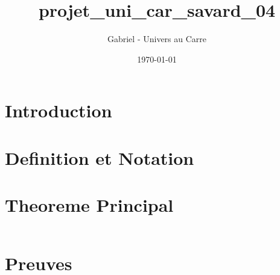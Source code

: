 \documentclass[12pt]{article}
\title{projet_uni_car_savard_04}
\author{Gabriel - Univers au Carre}
\date{\today}
\begin{document}
\maketitle


\section{Introduction}



\section{Definition et Notation}



\section{Theoreme Principal}


\begin{equation}
\end{equation}


\section{Preuves}


\end{document}
